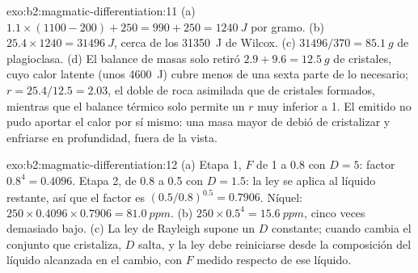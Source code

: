 \begin{solution}{exo:b2:magmatic-differentiation:11}
(a) $1.1\times(1100 - 200) + 250 = 990 + 250 = \qty{1240}{J}$ por gramo. (b)
$25.4\times1240 = \qty{31496}{J}$, cerca de los \qty{31350}{J} de Wilcox. (c)
$31496/370 = \qty{85.1}{g}$ de plagioclasa. (d) El balance de masas solo retiró $2.9 +
9.6 = \qty{12.5}{g}$ de cristales, cuyo calor latente (unos \qty{4600}{J}) cubre menos
de una sexta parte de lo necesario; $r = 25.4/12.5 = 2.03$, el doble de roca asimilada que de
cristales formados, mientras que el balance térmico solo permite un $r$ muy inferior a 1. El  emitido
no pudo aportar el calor por sí mismo: una masa mayor de  debió de cristalizar
y enfriarse en profundidad, fuera de la vista.
\end{solution}

\begin{solution}{exo:b2:magmatic-differentiation:12}
(a) Etapa 1, $F$ de 1 a 0.8 con $D = 5$: factor $0.8^{4} = 0.4096$. Etapa 2,
de 0.8 a 0.5 con $D = 1.5$: la ley se aplica al líquido restante, así que el
factor es $(0.5/0.8)^{0.5} = 0.7906$. Níquel: $250\times0.4096\times0.7906 =
\qty{81.0}{ppm}$. (b) $250\times0.5^{4} = \qty{15.6}{ppm}$, cinco veces demasiado bajo. (c)
La ley de Rayleigh supone un $D$ constante; cuando cambia el conjunto que cristaliza,
$D$ salta, y la ley debe reiniciarse desde la composición del líquido alcanzada en el
cambio, con $F$ medido respecto de ese líquido.
\end{solution}

